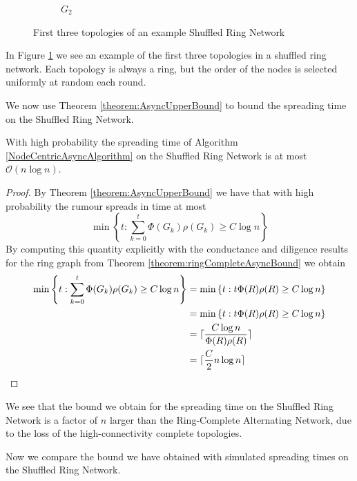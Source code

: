 \begin{figure}[h]
\begin{subfigure}[b]{0.3\textwidth}
		\caption*{$G_2$}
	\end{subfigure}
	\caption{First three topologies of an example Shuffled Ring Network}
	\label{fig:shuffledRingExample}
\end{figure}

In Figure \ref{fig:shuffledRingExample} we see an example of the first three topologies in a shuffled ring network. Each topology is always a ring, but the order of the nodes is selected uniformly at random each round.

We now use Theorem \ref{theorem:AsyncUpperBound} to bound the spreading time on the Shuffled Ring Network.

\begin{theorem}
	With high probability the spreading time of Algorithm \ref{NodeCentricAsyncAlgorithm} on the Shuffled Ring Network is at most $\mathcal{O}(n \log n)$.
\end{theorem}

\begin{proof}
	By Theorem \ref{theorem:AsyncUpperBound} we have that with high probability the rumour spreads in time at most 
	$$
		\min \left\{t : \sum_{k=0}^t \Phi(G_k)\rho(G_k) \geq C \log n \right\} 
	$$
	By computing this quantity explicitly with the conductance and diligence results for the ring graph from Theorem \ref{theorem:ringCompleteAsyncBound} we obtain
	\begin{align*}
		\min \left\{t : \sum_{k=0}^t \Phi(G_k)\rho(G_k) \geq C \log n \right\} 
		&= \min \left\{t : t \Phi(R)\rho(R) \geq C \log n \right\} \\
		&= \min \left\{t : t \Phi(R)\rho(R) \geq C \log n \right\} \\
		&= \lceil\frac{C \log n}{\Phi(R)\rho(R)}\rceil \\
		&= \lceil\frac{C}{2}n \log n\rceil
	\end{align*}
\end{proof}

We see that the bound we obtain for the spreading time on the Shuffled Ring Network is a factor of $n$ larger than the Ring-Complete Alternating Network, due to the loss of the high-connectivity complete topologies. %

Now we compare the bound we have obtained with simulated spreading times on the Shuffled Ring Network.

